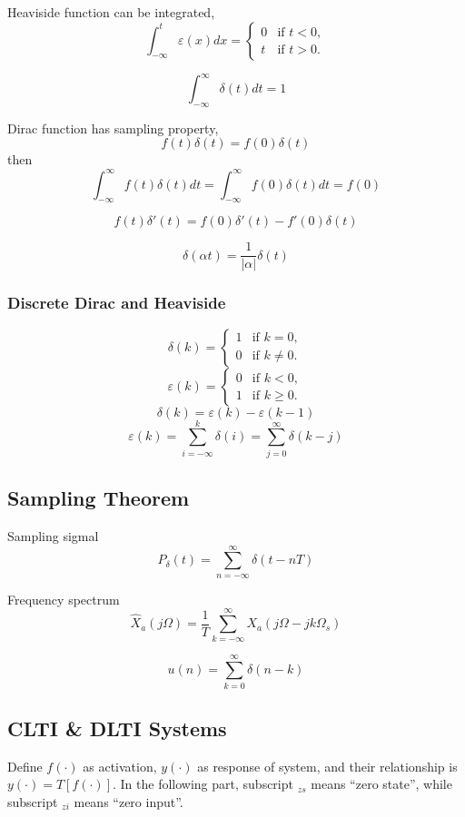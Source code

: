  Heaviside function can be integrated,
 \[ \int_{-\infty}^t \varepsilon(x)dx = \left\{ \begin{array}{rl}
			 0 & \text{if } t < 0,\\
			 t & \text{if } t > 0.
		 \end{array} \right.
 \]

 \[ \int_{-\infty}^\infty \delta(t) dt = 1 \]

 Dirac function has sampling property,
 \[ f(t)\delta(t) = f(0)\delta(t) \]
 then
 \[ \int_{-\infty}^\infty f(t)\delta(t) dt = \int_{-\infty}^\infty f(0)\delta(t) dt = f(0) \]

 \[ f(t)\delta'(t) = f(0)\delta'(t) - f'(0)\delta(t) \]
 
 \[ \delta(\alpha t) = \frac{1}{|\alpha|} \delta(t) \]

 \subsubsection{Discrete Dirac and Heaviside}
 \[ \delta(k) = \left\{ 
	 \begin{array}{rl}
	 1 & \text{if } k = 0, \\
	 0 & \text{if } k \neq 0.
	 \end{array} \right.
 \]
 \[ \varepsilon(k) = \left\{
		\begin{array}{rl}
			0 & \text{if } k < 0,\\
			1 & \text{if } k \geqslant 0.
		\end{array} \right.
 \]
 \[ \delta(k) = \varepsilon(k) - \varepsilon(k-1) \]
 \[ \varepsilon(k) = \sum^k_{i=-\infty} \delta(i) = \sum^\infty_{j=0} \delta(k-j)\]

\subsection{Sampling Theorem}

 Sampling sigmal
 $$ P_\delta (t) = \sum\limits_{n=-\infty}^\infty \delta(t-nT) $$
 
 Frequency spectrum
 $$ \hat{X}_a (j\Omega) = \frac{1}{T} \sum\limits_{k=-\infty}^\infty X_a(j\Omega - jk\Omega_s) $$
 
 $$ u(n) = \sum\limits_{k=0}^\infty \delta(n-k) $$
 
\subsection{CLTI \& DLTI Systems}

 Define $f(\cdot)$ as activation, $y(\cdot)$ as response of system,
 and their relationship is $y(\cdot) = T[f(\cdot)]$. In the following
 part, subscript $_{zs}$ means ``zero state'', while subscript $_{zi}$
 means ``zero input''.

